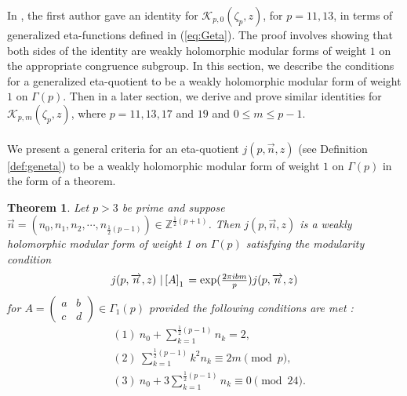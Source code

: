 \documentclass[12pt]{amsart}
\newtheorem{theorem}{Theorem}[section]
\theoremstyle{definition}
\theoremstyle{remark}
\numberwithin{equation}{section}
\newcommand\stroke[3]{#1\,\left\arrowvert\,\left[#2\right]_{#3}\right.}
\newcommand\eqn[1]{(\ref{eq:#1})}
\newcommand\refdef[1]{\ref{def:#1}}
\begin{document}
In \cite{Ga19a}, the first author gave an identity for  $\mathcal{K}_{p,0}(\zeta_{p},z)$, for  $p=11,13$, in terms of generalized eta-functions defined in \eqn{Geta}. The proof involves showing that both sides of the identity are weakly holomorphic modular forms of weight $1$ on the appropriate congruence subgroup. In this section, we describe the conditions for a generalized eta-quotient to be a weakly holomorphic modular form of weight $1$ on $\Gamma(p)$. Then in a later section, we derive and prove similar identities for $\mathcal{K}_{p,m}(\zeta_{p},z)$, where $p=11, 13, 17$ and $19$ and $0\leq m \leq p-1$.
\\\\
We present a general criteria for an eta-quotient $j(p,\overrightarrow{n},z)$ (see Definition \refdef{geneta}) to be a weakly holomorphic modular form of weight $1$ on $\Gamma(p)$ in the form of a theorem.
\\
\begin{theorem}\label{thm:modular}
Let $p>3$ be prime and suppose 
$\overrightarrow{n}=(n_0,n_1,n_2,\cdots ,n_{\frac{1}{2}(p-1)}) \in \mathbb{Z}^{\frac{1}{2}(p+1)}$.
Then $j(p,\overrightarrow{n},z)$ is a weakly holomorphic modular form 
of weight 1 on $\Gamma(p)$ satisfying the modularity condition 
$$
j(p,\overrightarrow{n},z)\stroke{}{A}{1}
=\exp(\tfrac{2\pi i b m}{p})j(p,\overrightarrow{n},z)
$$
for $A=\begin{pmatrix} a & b \\ c & d\end{pmatrix} \in \Gamma_1(p)$ 
provided the following conditions are met :
\begin{align*}
&(1)~n_0+\sum_{k=1}^{\frac{1}{2}(p-1)}n_k=2,
\\
&(2)~\sum_{k=1}^{\frac{1}{2}(p-1)}k^2 n_k \equiv 2m \pmod{p},
\\
&(3)~n_0+3\sum_{k=1}^{\frac{1}{2}(p-1)}n_k \equiv 0 \pmod{24}. 
\end{align*}
\end{theorem}
\end{document}
